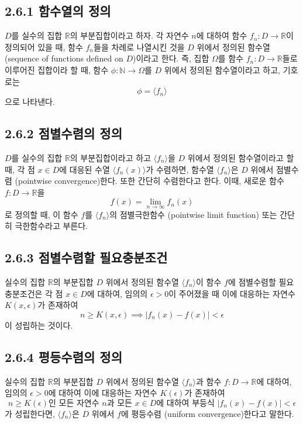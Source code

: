\documentclass{article}
\begin{document}
\subsection*{\textmd{2.6.1 함수열의 정의}}
\( D \)를 실수의 집합 \( \mathbb{R} \)의 부분집합이라고 하자. 각 자연수 \( n \)에 대하여 함수 \( f_n : D \to \mathbb{R} \)이 정의되어 있을 때, 함수 \( f_n \)들을 차례로 나열시킨 것을 \( D \) 위에서 정의된 함수열 (sequence of functions defined on \( D \))이라고 한다. 즉, 집합 \( \Omega \)를 함수 \( f_n : D \to \mathbb{R} \)들로 이루어진 집합이라 할 때, 함수 \( \phi : \mathbb{N} \to \Omega \)를 \( D \) 위에서 정의된 함수열이라고 하고, 기호로는
\[
\phi = \langle f_n \rangle
\]
으로 나타낸다.

\subsection*{\textmd{2.6.2 점별수렴의 정의}}
\( D \)를 실수의 집합 \( \mathbb{R} \)의 부분집합이라고 하고 \( \langle f_n \rangle \)을 \( D \) 위에서 정의된 함수열이라고 할 때, 각 점 \( x \in D \)에 대응된 수열 \( \langle f_n(x) \rangle \)가 수렴하면, 함수열
\( \langle f_n \rangle \)은 \( D \) 위에서 점별수렴 (pointwise convergence)한다. 또한 간단히 수렴한다고 한다. 이때, 새로운 함수 \( f : D \to \mathbb{R} \)을 
\[
f(x) = \lim_{n \to \infty} f_n(x)
\]
로 정의할 때, 이 함수 \( f \)를 \( \langle f_n \rangle \)의 점별극한함수 (pointwise limit function) 또는 간단히 극한함수라고 부른다.

\subsection*{\textmd{2.6.3 점별수렴할 필요충분조건}}
실수의 집합 \( \mathbb{R} \)의 부분집합 \( D \) 위에서 정의된 함수열 \( \langle f_n \rangle \)이 함수 \( f \)에 점별수렴할 필요충분조건은 각 점 \( x \in D \)에 대하여, 임의의 \( \epsilon > 0 \)이 주어졌을 때 이에 대응하는 자연수 \( K(x, \epsilon) \)가 존재하여
\[
n \geq K(x, \epsilon) \implies | f_n(x) - f(x) | < \epsilon
\]
이 성립하는 것이다.

\subsection*{\textmd{2.6.4 평등수렴의 정의}}
실수의 집합 \( \mathbb{R} \)의 부분집합 \( D \) 위에서 정의된 함수열 \( \langle f_n \rangle \)과 함수 \( f : D \to \mathbb{R} \)에 대하여, 
임의의 \( \epsilon > 0 \)에 대하여 이에 대응하는 자연수 \( K(\epsilon) \)가 존재하여
\[
n \geq K(\epsilon) \text{인 모든 자연수 } n \text{과 모든 } x \in D \text{에 대하여 부등식 }
| f_n(x) - f(x) | < \epsilon
\]
가 성립한다면, \( \langle f_n \rangle \)은 \( D \) 위에서 \( f \)에 평등수렴 (uniform convergence)한다고 말한다.
\end{document}
